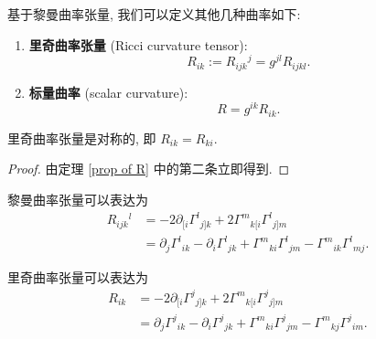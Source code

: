 \begin{definition}
\label{curvature}
	基于黎曼曲率张量, 我们可以定义其他几种曲率如下:
	\begin{enumerate}
		\item {\bf 里奇曲率张量} (Ricci curvature tensor):
		\[ R_{ik}:=R_{ijk}{}^{j}=g^{jl}R_{ijkl}. \] 
		\item {\bf 标量曲率} (scalar curvature):
		\[ R=g^{ik}R_{ik}. \] 
	\end{enumerate}
\end{definition}
\begin{theorem}
\label{prop of Ri}
	里奇曲率张量是对称的, 即 $ R_{ik}=R_{ki} $. 
\end{theorem}
\begin{proof}
	由定理 \ref{prop of R} 中的第二条立即得到.
\end{proof}
\begin{theorem}
\label{R-Gamma}
	黎曼曲率张量可以表达为
	\begin{align*}
		R_{ijk}{}^{l}&=-2\partial_{[i}\Gamma^{l}{}_{j]k}+2\Gamma^{m}{}_{k[i}\Gamma^{l}{}_{j]m}\\
		&=\partial_j\Gamma^{l}{}_{ik}-\partial_i\Gamma^{l}{}_{jk}+\Gamma^{m}{}_{ki}\Gamma^{l}{}_{jm}-\Gamma^{m}{}_{ik}\Gamma^{l}{}_{mj}.
	\end{align*}
\end{theorem}
\begin{theorem}
\label{Ri-Gamma}
	里奇曲率张量可以表达为
	\begin{align*}
		R_{ik}&=-2\partial_{[i}\Gamma^{j}{}_{j]k}+2\Gamma^{m}{}_{k[i}\Gamma^{j}{}_{j]m}\\
		&=\partial_j\Gamma^{j}{}_{ik}-\partial_i\Gamma^{j}{}_{jk}+\Gamma^{m}{}_{ki}\Gamma^{j}{}_{jm}-\Gamma^{m}{}_{kj}\Gamma^{j}{}_{im}.
	\end{align*}
\end{theorem}
